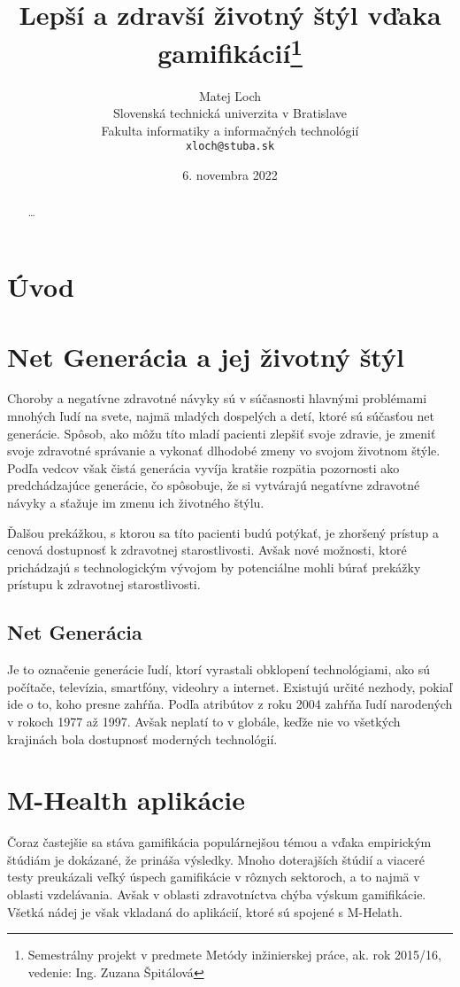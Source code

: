 \documentclass[10pt,twoside,slovak,a4paper]{article}
\title{Lepší a zdravší životný štýl vďaka gamifikácií\thanks{Semestrálny projekt v predmete Metódy inžinierskej práce, ak. rok 2015/16, vedenie: Ing. Zuzana Špitálová}} %
\author{Matej Ľoch\\[2pt]
	{\small Slovenská technická univerzita v Bratislave}\\
	{\small Fakulta informatiky a informačných technológií}\\
	{\small \texttt{xloch@stuba.sk}}
	}
\date{\small 6. novembra 2022} %
\begin{document}
\maketitle

\begin{abstract}
\ldots
\end{abstract}



\section{Úvod}





\section{Net Generácia a jej životný štýl} \label{net_generacia_a_jej_zivotny_styl}


Choroby a negatívne zdravotné návyky sú v súčasnosti hlavnými problémami mnohých ľudí na svete, najmä mladých dospelých a detí, ktoré sú súčasťou net generácie. Spôsob, ako môžu títo mladí pacienti zlepšiť svoje zdravie, je zmeniť svoje zdravotné správanie a vykonať dlhodobé zmeny vo svojom životnom štýle. Podľa vedcov však čistá generácia vyvíja kratšie rozpätia pozornosti ako predchádzajúce generácie, čo spôsobuje, že si vytvárajú negatívne zdravotné návyky a sťažuje im zmenu ich životného štýlu.

Ďalšou prekážkou, s ktorou sa títo pacienti budú potýkať, je zhoršený prístup a cenová dostupnosť k zdravotnej starostlivosti. Avšak nové možnosti, ktoré prichádzajú s technologickým vývojom by potenciálne mohli búrať prekážky prístupu k zdravotnej starostlivosti.


\subsection{Net Generácia} \label{net_generacia_a_jej_zivotny_styl:net_generacia}
Je to označenie generácie ľudí, ktorí vyrastali obklopení technológiami, ako sú počítače, televízia, smartfóny, videohry a internet. Existujú určité nezhody, pokiaľ ide o to, koho presne zahŕňa. Podľa atribútov z roku 2004 zahŕňa ľudí narodených v rokoch 1977 až 1997. Avšak neplatí to v globále, keďže nie vo všetkých krajinách bola dostupnosť moderných technológií.

\section{M-Health aplikácie} \label{m_health_aplikacie}
Čoraz častejšie sa stáva gamifikácia populárnejšou témou a vďaka empirickým štúdiám je dokázané, že prináša výsledky. Mnoho doterajších štúdií a viaceré testy preukázali veľký úspech gamifikácie v rôznych sektoroch, a to najmä v oblasti vzdelávania. Avšak v oblasti zdravotníctva chýba výskum gamifikácie. Všetká nádej je však vkladaná do aplikácií, ktoré sú spojené s M-Helath. 
\end{document}

